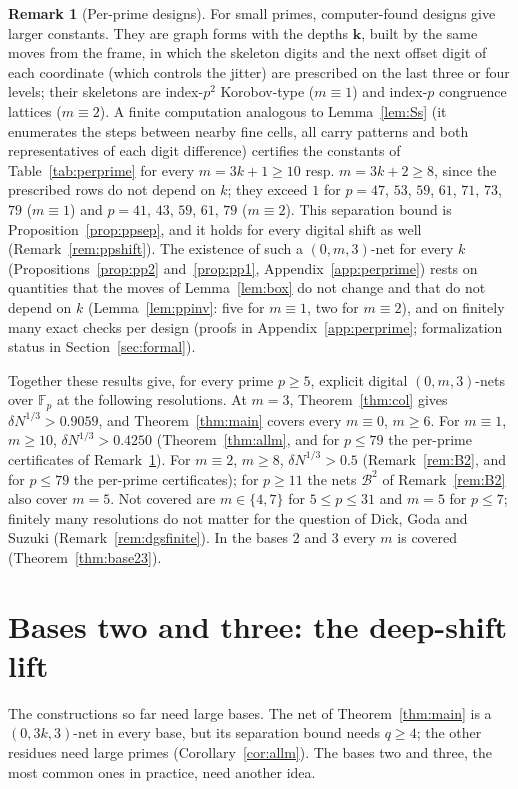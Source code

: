 \documentclass[11pt]{amsart}
\theoremstyle{definition}
\newtheorem{remark}[theorem]{Remark}
\theoremstyle{plain}
\newcommand{\F}{\mathbb{F}}
\begin{document}
\begin{remark}[Per-prime designs]\label{rem:perprime}
For small primes, computer-found designs give larger constants. They are graph forms with the depths $\mathbf k$, built by the same moves from the frame, in which the skeleton digits and the next offset digit of each coordinate (which controls the jitter) are prescribed on the last three or four levels; their skeletons are index-$p^2$ Korobov-type ($m\equiv1$) and index-$p$ congruence lattices ($m\equiv2$). A finite computation analogous to Lemma~\ref{lem:Ss} (it enumerates the steps between nearby fine cells, all carry patterns and both representatives of each digit difference) certifies the constants of Table~\ref{tab:perprime} for every $m=3k+1\ge10$ resp. $m=3k+2\ge8$, since the prescribed rows do not depend on $k$; they exceed $1$ for $p=47$, $53$, $59$, $61$, $71$, $73$, $79$ ($m\equiv1$) and $p=41$, $43$, $59$, $61$, $79$ ($m\equiv2$). This separation bound is Proposition~\ref{prop:ppsep}, and it holds for every digital shift as well (Remark~\ref{rem:ppshift}). The existence of such a $(0,m,3)$-net for every $k$ (Propositions~\ref{prop:pp2} and~\ref{prop:pp1}, Appendix~\ref{app:perprime}) rests on quantities that the moves of Lemma~\ref{lem:box} do not change and that do not depend on $k$ (Lemma~\ref{lem:ppinv}: five for $m\equiv1$, two for $m\equiv2$), and on finitely many exact checks per design (proofs in Appendix~\ref{app:perprime}; formalization status in Section~\ref{sec:formal}).
\end{remark}

Together these results give, for every prime $p\ge5$, explicit digital $(0,m,3)$-nets over $\F_p$ at the following resolutions. At $m=3$, Theorem~\ref{thm:col} gives $\delta N^{1/3}>0.9059$, and Theorem~\ref{thm:main} covers every $m\equiv0$, $m\ge6$. For $m\equiv1$, $m\ge10$, $\delta N^{1/3}>0.4250$ (Theorem~\ref{thm:allm}, and for $p\le79$ the per-prime certificates of Remark~\ref{rem:perprime}). For $m\equiv2$, $m\ge8$, $\delta N^{1/3}>0.5$ (Remark~\ref{rem:B2}, and for $p\le79$ the per-prime certificates); for $p\ge11$ the nets $\mathcal B^2$ of Remark~\ref{rem:B2} also cover $m=5$. Not covered are $m\in\{4,7\}$ for $5\le p\le31$ and $m=5$ for $p\le7$; finitely many resolutions do not matter for the question of Dick, Goda and Suzuki (Remark~\ref{rem:dgsfinite}). In the bases $2$ and $3$ every $m$ is covered (Theorem~\ref{thm:base23}).

\section{Bases two and three: the deep-shift lift}\label{sec:base23}
The constructions so far need large bases. The net of Theorem~\ref{thm:main} is a $(0,3k,3)$-net in every base, but its separation bound needs $q\ge4$; the other residues need large primes (Corollary~\ref{cor:allm}). The bases two and three, the most common ones in practice, need another idea.
\end{document}

